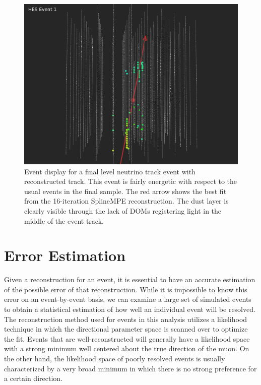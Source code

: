 \documentclass{gatech-thesis}
\begin{document}
\begin{figure}[ht]
  \begin{center}
    \includegraphics[width=1.0\textwidth,keepaspectratio]{HES_Upgoing_WithReco.png}
  \end{center}
  \caption{Event display for a final level neutrino track event with reconstructed track. This event is fairly energetic with respect to the usual events in the final sample. The red arrow shows the best fit from the 16-iteration SplineMPE reconstruction. The dust layer is clearly visible through the lack of DOMs registering light in the middle of the event track.}
  \label{fig:HESEventWithReco}
\end{figure}

\section{Error Estimation}
Given a reconstruction for an event, it is essential to have an accurate estimation of the possible error of that reconstruction. While it is impossible to know this error on an event-by-event basis, we can examine a large set of simulated events to obtain a statistical estimation of how well an individual event will be resolved. The reconstruction method used for events in this analysis utilizes a likelihood technique in which the directional parameter space is scanned over to optimize the fit. Events that are well-reconstructed will generally have a likelihood space with a strong minimum well centered about the true direction of the muon. On the other hand, the likelihood space of poorly resolved events is usually characterized by a very broad minimum in which there is no strong preference for a certain direction.
\end{document}
